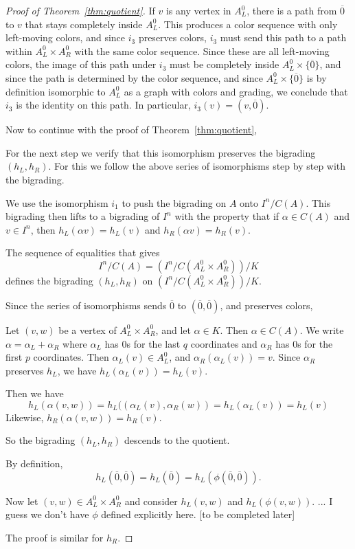 \documentclass[12pt,twoside,singlespace]{article}
\numberwithin{equation}{section}
\theoremstyle{definition}
\begin{document}
\begin{proof}[Proof of Theorem~\ref{thm:quotient}]
If $v$ is any vertex in $A_L^0$, there is a path from $\overline{0}$ to $v$ that stays completely inside $A_L^0$.  This produces a color sequence with only left-moving colors, and since $i_3$ preserves colors, $i_3$ must send this path to a path within $A_L^0\times A_R^0$ with the same color sequence.  Since these are all left-moving colors, the image of this path under $i_3$ must be completely inside $A_L^0\times \{\overline{0}\}$, and since the path is determined by the color sequence, and since $A_L^0\times\{\overline{0}\}$ is by definition isomorphic to $A_L^0$ as a graph with colors and grading, we conclude that $i_3$ is the identity on this path.  In particular, $i_3(v)=(v,\overline{0})$.


Now to continue with the proof of Theorem~\ref{thm:quotient},


For the next step we verify that this isomorphism preserves the bigrading $(h_L,h_R)$.  For this we follow the above series of isomorphisms step by step with the bigrading.

We use the isomorphism $i_1$ to push the bigrading on $A$ onto $I^n/C(A)$.  This bigrading then lifts to a bigrading of $I^n$ with the property that if $\alpha\in C(A)$ and $v\in I^n$, then $h_L(\alpha v)=h_L(v)$ and $h_R(\alpha v)=h_R(v)$.

The sequence of equalities that gives
\[I^n/C(A)=(I^n/C(A_L^0\times A_R^0))/K\]
defines the bigrading $(h_L,h_R)$ on $(I^n/C(A_L^0\times A_R^0))/K$.



Since the series of isomorphisms sends $\overline{0}$ to $(\overline{0},\overline{0})$, and preserves colors, 





Let $(v,w)$ be a vertex of $A_L^0\times A_R^0$, and let $\alpha\in K$.  Then $\alpha\in C(A)$.  We write $\alpha=\alpha_L+\alpha_R$ where $\alpha_L$ has $0$s for the last $q$ coordinates and $\alpha_R$ has $0$s for the first $p$ coordinates.  Then $\alpha_L(v)\in A_L^0$, and $\alpha_R(\alpha_L(v))=v$.  Since $\alpha_R$ preserves $h_L$, we have $h_L(\alpha_L(v))=h_L(v)$.

Then we have
\[h_L(\alpha(v,w))=h_L((\alpha_L(v),\alpha_R(w))=h_L(\alpha_L(v))=h_L(v)\]
Likewise, $h_R(\alpha(v,w))=h_R(v)$.

So the bigrading $(h_L,h_R)$ descends to the quotient.

By definition,
\[h_L(\overline{0},\overline{0})=h_L(\overline{0})=h_L(\phi(\overline{0},\overline{0})).\]

Now let $(v,w)\in A_L^0\times A_R^0$ and consider $h_L(v,w)$ and $h_L(\phi(v,w))$.     ...  I guess we don't have $\phi$ defined explicitly here.  [to be completed later]

The proof is similar for $h_R$.
\end{proof}
\end{document}
